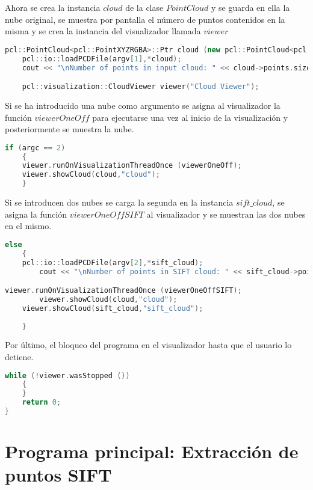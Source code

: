 Ahora se crea la instancia $cloud$ de la clase $PointCloud$ y se guarda en ella la nube original, se muestra por pantalla el número de puntos contenidos en la misma y se crea la instancia del visualizador llamada $viewer$

\begin{lstlisting}[language=C++,breaklines]
pcl::PointCloud<pcl::PointXYZRGBA>::Ptr cloud (new pcl::PointCloud<pcl::PointXYZRGBA>); 
    pcl::io::loadPCDFile(argv[1],*cloud);
    cout << "\nNumber of points in input cloud: " << cloud->points.size() << "\n";

    pcl::visualization::CloudViewer viewer("Cloud Viewer");
\end{lstlisting}

Si se ha introducido una nube como argumento se asigna al visualizador la función $viewerOneOff$ para ejecutarse una vez al inicio de la visualización y posteriormente se muestra la nube.

\begin{lstlisting}[language=C++,breaklines]
if (argc == 2)
    {
	viewer.runOnVisualizationThreadOnce (viewerOneOff);
	viewer.showCloud(cloud,"cloud");
    }
\end{lstlisting}

Si se introducen dos nubes se carga la segunda en la instancia $sift\_cloud$, se asigna la función $viewerOneOffSIFT$ al visualizador y se muestran las dos nubes en el mismo.

\begin{lstlisting}[language=C++,breaklines]
else 
    {
	pcl::io::loadPCDFile(argv[2],*sift_cloud);
        cout << "\nNumber of points in SIFT cloud: " << sift_cloud->points.size() << "\n";

viewer.runOnVisualizationThreadOnce (viewerOneOffSIFT);
    	viewer.showCloud(cloud,"cloud");
   	viewer.showCloud(sift_cloud,"sift_cloud");
 
    }
\end{lstlisting}

Por último, el bloqueo del programa en el visualizador hasta que el usuario lo detiene.
\begin{lstlisting}[language=C++,breaklines]
   while (!viewer.wasStopped ())
    {
    }
    return 0;
}
\end{lstlisting}

\section{Programa principal: Extracción de puntos SIFT}
